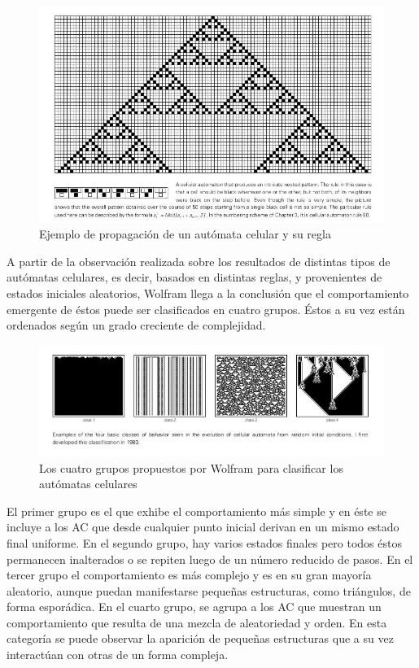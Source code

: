 \documentclass[16pt,spanish]{article}
\begin{document}
\begin{figure}[ht]
	\centering
	\includegraphics[width=0.5\linewidth, bb = 0 0 782 490]{imagesCA/Example-3.jpg}
	\caption{Ejemplo de propagación de un autómata celular y su regla~\cite{wolfram2002new}}
\end{figure}

	A partir de la observación realizada sobre los resultados de distintas tipos
	de autómatas celulares, es decir, basados en distintas reglas, y provenientes
	de estados iniciales aleatorios, Wolfram llega a la conclusión que el
	comportamiento emergente de éstos puede ser clasificados en cuatro grupos.
	Éstos a su vez están ordenados según un grado creciente de complejidad.


\begin{figure}[ht]
	\includegraphics[width=\linewidth, bb = 0 0 637 206 ]{imagesCA/clasificacion.jpg}
	\caption{Los cuatro grupos propuestos por Wolfram para clasificar los autómatas celulares~\cite{wolfram2002new}}
\end{figure}


	El primer grupo es el que exhibe el comportamiento más simple y en éste se
	incluye a los AC que desde cualquier punto inicial derivan en un mismo
	estado final uniforme.  En el segundo grupo, hay varios estados finales pero
	todos éstos permanecen inalterados o se repiten luego de un número reducido
	de pasos.  En el tercer grupo el comportamiento es más complejo y es en su
	gran mayoría aleatorio, aunque puedan manifestarse pequeñas estructuras, como
	triángulos, de forma esporádica.  En el cuarto grupo, se agrupa a los AC que
	muestran un comportamiento que resulta de una mezcla de aleatoriedad y orden.
	En esta categoría se puede observar la aparición de pequeñas estructuras que
	a su vez interactúan con otras de un forma compleja.		
\end{document}
